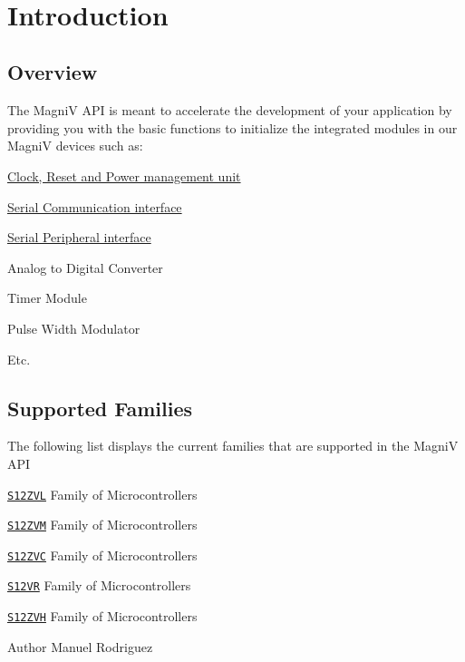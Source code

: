 ~\newline
 \section*{Introduction}


\begin{DoxyItemize}
\item \subsection*{Overview}



The Magni\+V A\+P\+I is meant to accelerate the development of your application by providing you with the basic functions to initialize the integrated modules in our Magni\+V devices such as\+: 
\begin{DoxyItemize}
\item \hyperlink{group___c_p_m_u}{Clock, Reset and Power management unit}  
\item \hyperlink{group___s_c_i}{Serial Communication interface}  
\item \hyperlink{group___s_p_i}{Serial Peripheral interface} 
\item Analog to Digital Converter 
\item Timer Module 
\item Pulse Width Modulator 
\item Etc. 
\end{DoxyItemize}



 
\item \subsection*{Supported Families}



The following list displays the current families that are supported in the Magni\+V A\+P\+I 
\begin{DoxyItemize}
\item \href{http://www.freescale.com/s12zvl}{\tt S12\+Z\+V\+L} Family of Microcontrollers 
\item \href{http://www.freescale.com/s12zvm}{\tt S12\+Z\+V\+M} Family of Microcontrollers 
\item \href{http://www.freescale.com/s12zvc}{\tt S12\+Z\+V\+C} Family of Microcontrollers 
\item \href{http://www.freescale.com/s12vr}{\tt S12\+V\+R} Family of Microcontrollers 
\item \href{http://www.freescale.com/s12zvh}{\tt S12\+Z\+V\+H} Family of Microcontrollers 
\end{DoxyItemize}


\end{DoxyItemize}

\begin{DoxyAuthor}{Author}
Manuel Rodriguez 
\end{DoxyAuthor}
